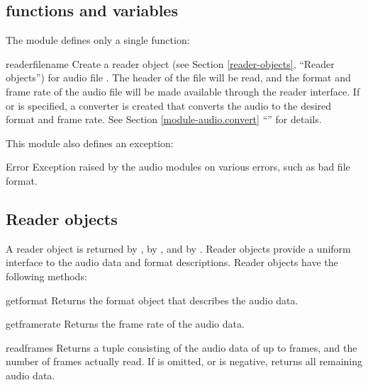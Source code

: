 \localmoduletable


\subsection{ functions and variables}

The  module defines only a single function:

\begin{funcdesc}{reader}{filename}
Create a reader object (see Section \ref{reader-objects}, ``Reader
objects'') for audio file .  The header of the file will
be read, and the format and frame rate of the audio file will be made
available through the reader interface.  If  or
 is specified, a converter is created that converts the
audio to the desired format and frame rate.  See Section
\ref{module-audio.convert} ``'' for details.
\end{funcdesc}

This module also defines an exception:

\begin{excdesc}{Error}
Exception raised by the audio modules on various errors, such as bad
file format.
\end{excdesc}


\subsection{Reader objects
            \label{reader-objects}}

A reader object is returned by , by
, and by .
Reader objects provide a uniform interface to the audio data and
format descriptions.  Reader objects have the following methods:

\begin{methoddesc}{getformat}{}
Returns the format object that describes the audio data.
\end{methoddesc}

\begin{methoddesc}{getframerate}{}
Returns the frame rate of the audio data.
\end{methoddesc}

\begin{methoddesc}{readframes}{}
Returns a tuple consisting of the audio data of up to 
frames, and the number of frames actually read.  If  is
omitted, or is negative, returns all remaining audio data.
\end{methoddesc}

